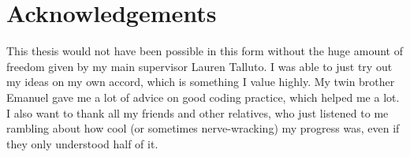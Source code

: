 \documentclass[12pt,a4paper]{article}
\begin{document}
\section{Acknowledgements} \label{sec:acknowledgements}
This thesis would not have been possible in this form without the huge amount of freedom given by my main supervisor Lauren Talluto.
I was able to just try out my ideas on my own accord, which is something I value highly.
My twin brother Emanuel gave me a lot of advice on good coding practice, which helped me a lot.
I also want to thank all my friends and other relatives, who just listened to me rambling about how cool (or sometimes nerve-wracking) my progress was, even if they only understood half of it.

\newpage
\printbibliography[]



\end{document}
